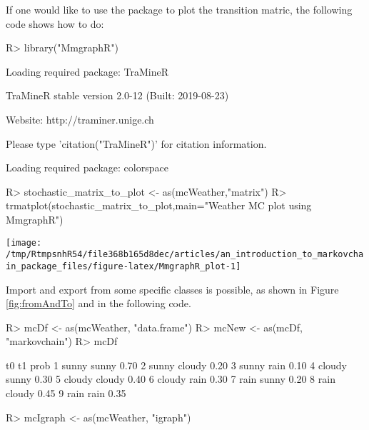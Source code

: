 \documentclass[
  nojss]{jss}
\begin{document}
If one would like to use the  package \citep{pkg:MmgraphR} to plot the transition matric, the following code shows how to do:

\begin{CodeChunk}

\begin{CodeInput}
R> library("MmgraphR")
\end{CodeInput}

\begin{CodeOutput}
Loading required package: TraMineR
\end{CodeOutput}

\begin{CodeOutput}

TraMineR stable version 2.0-12 (Built: 2019-08-23)
\end{CodeOutput}

\begin{CodeOutput}
Website: http://traminer.unige.ch
\end{CodeOutput}

\begin{CodeOutput}
Please type 'citation("TraMineR")' for citation information.
\end{CodeOutput}

\begin{CodeOutput}
Loading required package: colorspace
\end{CodeOutput}

\begin{CodeInput}
R> stochastic_matrix_to_plot <- as(mcWeather,"matrix")
R> trmatplot(stochastic_matrix_to_plot,main="Weather MC plot using MmgraphR")
\end{CodeInput}


\begin{center}\texttt{[image: /tmp/RtmpsnhR54/file368b165d8dec/articles/an\_introduction\_to\_markovchain\_package\_files/figure-latex/MmgraphR\_plot-1]} \end{center}

\end{CodeChunk}

Import and export from some specific classes is possible, as shown in Figure \ref{fig:fromAndTo} and in the following code.

\begin{CodeChunk}

\begin{CodeInput}
R> mcDf <- as(mcWeather, "data.frame")
R> mcNew <- as(mcDf, "markovchain")
R> mcDf
\end{CodeInput}

\begin{CodeOutput}
      t0     t1 prob
1  sunny  sunny 0.70
2  sunny cloudy 0.20
3  sunny   rain 0.10
4 cloudy  sunny 0.30
5 cloudy cloudy 0.40
6 cloudy   rain 0.30
7   rain  sunny 0.20
8   rain cloudy 0.45
9   rain   rain 0.35
\end{CodeOutput}

\begin{CodeInput}
R> mcIgraph <- as(mcWeather, "igraph")
\end{CodeInput}
\end{CodeChunk}
\end{document}
